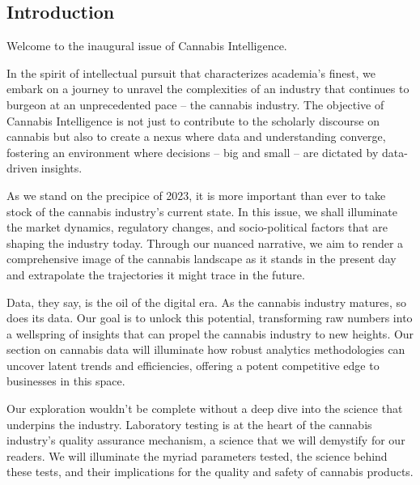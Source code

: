 \documentclass[../article.tex, 12pt]{subfiles}
\begin{document}
\begin{multicols*}{2}

\section{Introduction}
\label{sec:introduction}

\thispagestyle{titlepage}

Welcome to the inaugural issue of Cannabis Intelligence.

In the spirit of intellectual pursuit that characterizes academia's finest, we embark on a journey to unravel the complexities of an industry that continues to burgeon at an unprecedented pace – the cannabis industry. The objective of Cannabis Intelligence is not just to contribute to the scholarly discourse on cannabis but also to create a nexus where data and understanding converge, fostering an environment where decisions – big and small – are dictated by data-driven insights.

As we stand on the precipice of 2023, it is more important than ever to take stock of the cannabis industry's current state. In this issue, we shall illuminate the market dynamics, regulatory changes, and socio-political factors that are shaping the industry today. Through our nuanced narrative, we aim to render a comprehensive image of the cannabis landscape as it stands in the present day and extrapolate the trajectories it might trace in the future.

Data, they say, is the oil of the digital era. As the cannabis industry matures, so does its data. Our goal is to unlock this potential, transforming raw numbers into a wellspring of insights that can propel the cannabis industry to new heights. Our section on cannabis data will illuminate how robust analytics methodologies can uncover latent trends and efficiencies, offering a potent competitive edge to businesses in this space.

Our exploration wouldn't be complete without a deep dive into the science that underpins the industry. Laboratory testing is at the heart of the cannabis industry's quality assurance mechanism, a science that we will demystify for our readers. We will illuminate the myriad parameters tested, the science behind these tests, and their implications for the quality and safety of cannabis products.


\end{multicols*}
\end{document}
